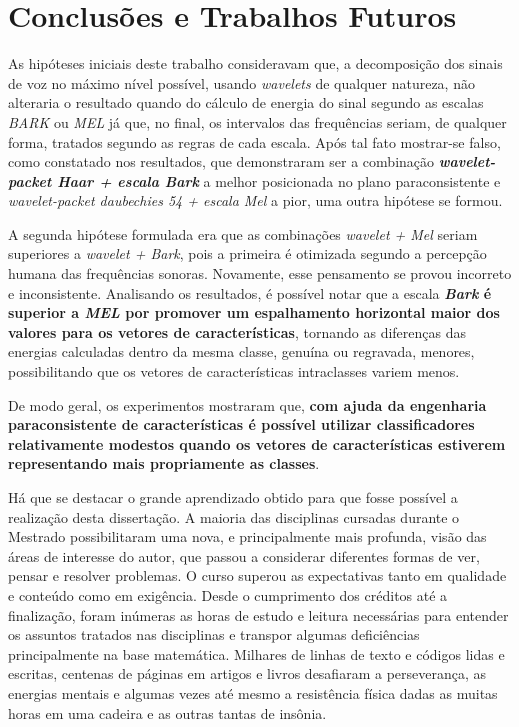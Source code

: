 \chapter{Conclusões e Trabalhos Futuros} \label{chap:conclusions}
	\par As hipóteses iniciais deste trabalho consideravam que, a decomposição dos sinais de voz no máximo nível possível, usando \textit{wavelets} de qualquer natureza, não alteraria o resultado quando do cálculo de energia do sinal segundo as escalas \textit{BARK} ou \textit{MEL} já que, no final, os intervalos das frequências seriam, de qualquer forma, tratados segundo as regras de cada escala. Após tal fato mostrar-se falso, como constatado nos resultados, que demonstraram ser a combinação \textbf{\textit{wavelet-packet Haar + escala Bark}} a melhor posicionada no plano paraconsistente e \textit{wavelet-packet daubechies 54 + escala Mel} a pior, uma outra hipótese se formou.
	
	\par A segunda hipótese formulada era que as combinações \textit{wavelet + Mel} seriam superiores a \textit{wavelet + Bark}, pois a primeira é otimizada segundo a percepção humana das frequências sonoras. Novamente, esse pensamento se provou incorreto e inconsistente. Analisando os resultados, é possível notar que a escala \textbf{\textit{Bark} é superior a \textit{MEL} por promover um espalhamento horizontal maior dos valores para os vetores de características}, tornando as diferenças das energias calculadas dentro da mesma classe, genuína ou regravada, menores, possibilitando que os vetores de características intraclasses variem menos.

    \par De modo geral, os experimentos mostraram que, \textbf{com ajuda da engenharia paraconsistente de características é possível utilizar classificadores relativamente modestos quando os vetores de características estiverem representando mais propriamente as classes}.
    
    \par Há que se destacar o grande aprendizado obtido para que fosse possível a realização desta dissertação. A maioria das disciplinas cursadas durante o Mestrado possibilitaram uma nova, e principalmente mais profunda, visão das áreas de interesse do autor, que passou a considerar diferentes formas de ver, pensar e resolver problemas. O curso superou as expectativas tanto em qualidade e conteúdo como em exigência. Desde o cumprimento dos créditos até a finalização, foram inúmeras as horas de estudo e leitura necessárias para entender os assuntos tratados nas disciplinas e transpor algumas deficiências principalmente na base matemática. Milhares de linhas de texto e códigos lidas e escritas, centenas de páginas em artigos e livros desafiaram a perseverança, as energias mentais e algumas vezes até mesmo a resistência física dadas as muitas horas em uma cadeira e as outras tantas de insônia.
    
